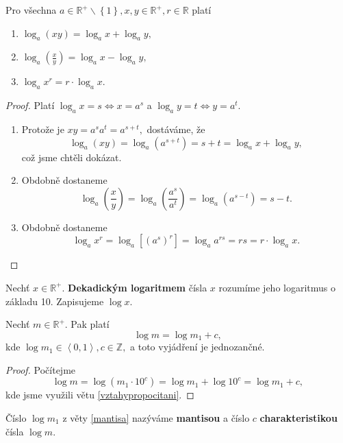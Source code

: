\begin{veta}\label{vztahypropocitani}
    Pro všechna $a \in \mathbb R^+ \smallsetminus \left \{ 1 \right \}, x,y \in \mathbb R^+
    , r \in \mathbb R$ platí
    \begin{enumerate}[$i.$]
        \item $\log_a (xy)=\log_a x + \log_a y,$
       	\item $\log_a \left ( \frac{x}{y} \right ) = \log_a x - \log_a y,$
       	\item $\log_a x^r = r\cdot \log_a x.$
    \end{enumerate}
\end{veta}

\begin{proof}
    Platí $\log_a x = s \iff x = a^s$ a
    $\log_a y = t \iff y = a^t.$
    \begin{enumerate}[$i.$]
        \item Protože je $xy = a^sa^t=a^{s+t},$ dostáváme, že
        $$\log_a (xy) = \log_a (a^{s+t}) = s+t=\log_a x + \log_a y,$$
        což jsme chtěli dokázat.
       	\item Obdobně dostaneme $$\log_a \left ( \frac{x}{y} \right )  = \log_a
        \left ( \frac{a^s}{a^t} \right ) =\log_a \left ( a^{s-t} \right ) =
        s-t.$$
       	\item Obdobně dostaneme $$\log_a x^r = \log_a \left [ \left ( a^s \right )^r  \right ] =
        \log_a a^{rs}=rs=r\cdot \log_a x.$$\qedhere
    \end{enumerate}
\end{proof}

\begin{definition}
    Nechť $x\in \mathbb R^+.$ \textbf{Dekadickým logaritmem} čísla $x$ rozumíme
    jeho logaritmus o základu 10. Zapisujeme $\log x.$
\end{definition}

\begin{veta}\label{mantisa}
    Nechť $m\in \mathbb R^+.$ Pak platí
    $$\log m = \log m_1 + c,$$
    kde $\log m_1 \in \left<  0,1 \right>, c \in \mathbb Z,$ a toto vyjádření
    je jednozančné.
\end{veta}

\begin{proof}
    Počítejme $$\log m = \log \left ( m_1\cdot 10^c \right ) = \log m_1 + \log 10^c
    = \log m_1 + c,$$
    kde jsme využili větu \ref{vztahypropocitani}.
\end{proof}

\begin{definition}
    Číslo $\log m_1$ z věty \ref{mantisa} nazýváme \textbf{mantisou} a číslo
    $c$ \textbf{charakteristikou} čísla $\log m.$
\end{definition}

